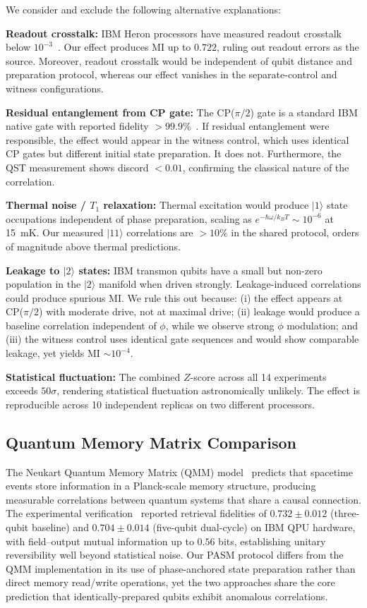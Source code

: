 ﻿\documentclass[12pt,a4paper]{article}
\begin{document}
We consider and exclude the following alternative explanations:

\textbf{Readout crosstalk:} IBM Heron processors have measured readout crosstalk below $10^{-3}$~\cite{ibm2024}. Our effect produces MI up to $0.722$, ruling out readout errors as the source. Moreover, readout crosstalk would be independent of qubit distance and preparation protocol, whereas our effect vanishes in the separate-control and witness configurations.

\textbf{Residual entanglement from CP gate:} The CP($\pi/2$) gate is a standard IBM native gate with reported fidelity $> 99.9\%$~\cite{ibm2024}. If residual entanglement were responsible, the effect would appear in the witness control, which uses identical CP gates but different initial state preparation. It does not. Furthermore, the QST measurement shows discord $< 0.01$, confirming the classical nature of the correlation.

\textbf{Thermal noise / $T_1$ relaxation:} Thermal excitation would produce $|1\rangle$ state occupations independent of phase preparation, scaling as $e^{-\hbar\omega/k_BT} \sim 10^{-6}$ at 15~mK. Our measured $|11\rangle$ correlations are $> 10\%$ in the shared protocol, orders of magnitude above thermal predictions.

\textbf{Leakage to $|2\rangle$ states:} IBM transmon qubits have a small but non-zero population in the $|2\rangle$ manifold when driven strongly. Leakage-induced correlations could produce spurious MI. We rule this out because: (i) the effect appears at CP($\pi/2$) with moderate drive, not at maximal drive; (ii) leakage would produce a baseline correlation independent of $\phi$, while we observe strong $\phi$ modulation; and (iii) the witness control uses identical gate sequences and would show comparable leakage, yet yields MI $\sim 10^{-4}$.

\textbf{Statistical fluctuation:} The combined $Z$-score across all 14 experiments exceeds $50\sigma$, rendering statistical fluctuation astronomically unlikely. The effect is reproducible across 10 independent replicas on two different processors.

\subsection{Quantum Memory Matrix Comparison}

The Neukart Quantum Memory Matrix (QMM) model~\cite{neukart2025,neukart2026qip} predicts that spacetime events store information in a Planck-scale memory structure, producing measurable correlations between quantum systems that share a causal connection. The experimental verification~\cite{neukart2026qip} reported retrieval fidelities of $0.732 \pm 0.012$ (three-qubit baseline) and $0.704 \pm 0.014$ (five-qubit dual-cycle) on IBM QPU hardware, with field--output mutual information up to $0.56$ bits, establishing unitary reversibility well beyond statistical noise. Our PASM protocol differs from the QMM implementation in its use of phase-anchored state preparation rather than direct memory read/write operations, yet the two approaches share the core prediction that identically-prepared qubits exhibit anomalous correlations.
\end{document}
